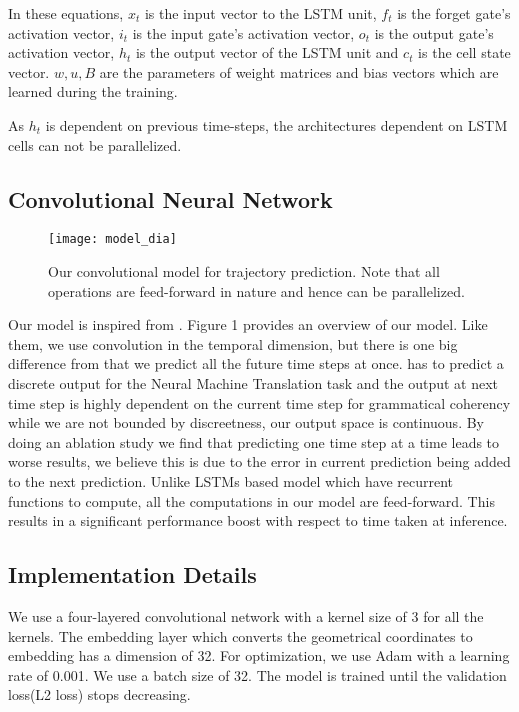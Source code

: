 \documentclass[runningheads]{llncs}
\begin{document}
In these equations, $x_t$ is the input vector to the LSTM unit, $f_t$ is the forget gate's activation vector, $i_t$ is the input gate's activation vector, $o_t$ is the output gate's activation vector, $h_t$ is the output vector of the LSTM unit and $c_t$ is the cell state vector. $w, u, B $ are the parameters of weight matrices and bias vectors which are learned during the training.

As $h_t$ is dependent on previous time-steps, the architectures dependent on LSTM cells can not be parallelized. 

\subsection{Convolutional Neural Network}

\begin{figure}[h!]

\centering
\texttt{[image: model\_dia]}
\caption{Our convolutional model for trajectory prediction. Note that all operations are feed-forward in nature and hence can be parallelized.}
\end{figure}



Our model is inspired from \cite{AnejaConvImgCap17}. Figure 1 provides an overview of our model. Like them, we use convolution in the temporal dimension, but there is one big difference from \cite{AnejaConvImgCap17} that we predict all the future time steps at once. \cite{AnejaConvImgCap17} has to predict a discrete output for the Neural Machine Translation task and the output at next time step is highly dependent on the current time step for grammatical coherency while we are not bounded by discreetness, our output space is continuous. By doing an ablation study we find that predicting one time step at a time leads to worse results, we believe this is due to the error in current prediction being added to the next prediction. Unlike LSTMs based model which have recurrent functions to compute, all the computations in our model are feed-forward. This results in a significant performance boost with respect to time taken at inference. 

\subsection{Implementation Details}

We use a four-layered convolutional network with a kernel size of 3 for all the kernels. The embedding layer which converts the geometrical coordinates to embedding has a dimension of 32. For optimization, we use Adam with a learning rate of 0.001. We use a batch size of 32. The model is trained until the validation loss(L2 loss) stops decreasing.
\end{document}
